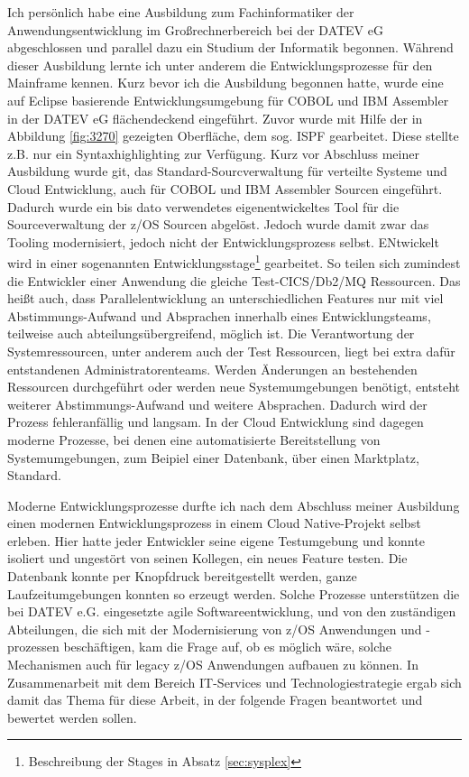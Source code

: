 Ich persönlich habe eine Ausbildung zum Fachinformatiker der Anwendungsentwicklung im Großrechnerbereich bei der DATEV eG abgeschlossen und parallel dazu ein Studium der Informatik begonnen.
Während dieser Ausbildung lernte ich unter anderem die Entwicklungsprozesse für den Mainframe kennen.
Kurz bevor ich die Ausbildung begonnen hatte, wurde eine auf Eclipse basierende Entwicklungsumgebung für COBOL und IBM Assembler in der DATEV eG flächendeckend eingeführt.
Zuvor wurde mit Hilfe der in Abbildung \ref{fig:3270} gezeigten Oberfläche, dem sog. ISPF gearbeitet.
Diese stellte z.B. nur ein Syntaxhighlighting zur Verfügung.
Kurz vor Abschluss meiner Ausbildung wurde git, das Standard-Sourcverwaltung für verteilte Systeme und Cloud Entwicklung, auch für COBOL und IBM Assembler Sourcen eingeführt.
Dadurch wurde ein bis dato verwendetes eigenentwickeltes Tool für die Sourceverwaltung der z/OS Sourcen abgelöst.
Jedoch wurde damit zwar das Tooling modernisiert, jedoch nicht der Entwicklungsprozess selbst.
ENtwickelt wird in einer sogenannten \glqq Entwicklungsstage\grqq{}\footnote{Beschreibung der Stages in Absatz \ref{sec:sysplex}} gearbeitet. 
So teilen sich zumindest die Entwickler einer Anwendung die gleiche Test-CICS/Db2/MQ Ressourcen.
Das heißt auch, dass Parallelentwicklung an unterschiedlichen Features nur mit viel Abstimmungs-Aufwand und Absprachen innerhalb eines Entwicklungsteams, teilweise auch abteilungsübergreifend, möglich ist.
Die Verantwortung der Systemressourcen, unter anderem auch der Test Ressourcen, liegt bei extra dafür entstandenen Administratorenteams.
Werden Änderungen an bestehenden Ressourcen durchgeführt oder werden neue Systemumgebungen benötigt, entsteht weiterer Abstimmungs-Aufwand und weitere Absprachen.
Dadurch wird der Prozess fehleranfällig und langsam.
In der Cloud Entwicklung sind dagegen moderne Prozesse, bei denen eine automatisierte Bereitstellung von Systemumgebungen, zum Beipiel einer Datenbank, über einen \glqq Marktplatz\grqq, Standard. 

Moderne Entwicklungsprozesse durfte ich nach dem Abschluss meiner Ausbildung einen modernen Entwicklungsprozess in einem \glqq Cloud Native\grqq-Projekt selbst erleben.
Hier hatte jeder Entwickler seine eigene Testumgebung und konnte isoliert und ungestört von seinen Kollegen, ein neues Feature testen.
Die Datenbank konnte per Knopfdruck bereitgestellt werden, ganze Laufzeitumgebungen konnten so erzeugt werden.
Solche Prozesse unterstützen die bei DATEV e.G. eingesetzte agile Softwareentwicklung, und von den zuständigen Abteilungen, die sich mit der Modernisierung von z/OS Anwendungen und -prozessen beschäftigen,  kam die Frage auf, ob es möglich wäre, solche Mechanismen auch für legacy z/OS Anwendungen aufbauen zu können.
In Zusammenarbeit mit dem Bereich IT-Services und Technologiestrategie ergab sich damit das Thema für diese Arbeit, in der folgende Fragen beantwortet und bewertet werden sollen.

